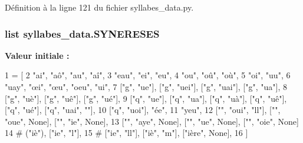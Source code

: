 Définition à la ligne 121 du fichier syllabes\+\_\+data.\+py.

\hypertarget{namespacesyllabes__data_ae813159a6c35a7e4f1f7e8714003465e}{}
\subsubsection[{S\+Y\+N\+E\+R\+E\+S\+E\+S}]{\setlength{\rightskip}{0pt plus 5cm}list syllabes\+\_\+data.\+S\+Y\+N\+E\+R\+E\+S\+E\+S}\label{namespacesyllabes__data_ae813159a6c35a7e4f1f7e8714003465e}
{\bfseries Valeur initiale \+:}
\begin{DoxyCode}
1 = [
2 \textcolor{stringliteral}{"ai"}, \textcolor{stringliteral}{"aô"}, \textcolor{stringliteral}{"au"}, \textcolor{stringliteral}{"aî"},
3 \textcolor{stringliteral}{"eau"}, \textcolor{stringliteral}{"ei"}, \textcolor{stringliteral}{"eu"},
4 \textcolor{stringliteral}{"ou"}, \textcolor{stringliteral}{"oû"}, \textcolor{stringliteral}{"où"},
5 \textcolor{stringliteral}{"oi"}, \textcolor{stringliteral}{"uu"},
6 \textcolor{stringliteral}{"uay"}, \textcolor{stringliteral}{"œi"}, \textcolor{stringliteral}{"œu"}, \textcolor{stringliteral}{"oeu"}, \textcolor{stringliteral}{"ui"},
7 [\textcolor{stringliteral}{"g"}, \textcolor{stringliteral}{"ue"}], [\textcolor{stringliteral}{"g"}, \textcolor{stringliteral}{"uei"}], [\textcolor{stringliteral}{"g"}, \textcolor{stringliteral}{"uai"}], [\textcolor{stringliteral}{"g"}, \textcolor{stringliteral}{"ua"}],
8 [\textcolor{stringliteral}{"g"}, \textcolor{stringliteral}{"uè"}], [\textcolor{stringliteral}{"g"}, \textcolor{stringliteral}{"uê"}], [\textcolor{stringliteral}{"g"}, \textcolor{stringliteral}{"ué"}],
9 [\textcolor{stringliteral}{"q"}, \textcolor{stringliteral}{"ue"}], [\textcolor{stringliteral}{"q"}, \textcolor{stringliteral}{"ua"}], [\textcolor{stringliteral}{"q"}, \textcolor{stringliteral}{"uà"}], [\textcolor{stringliteral}{"q"}, \textcolor{stringliteral}{"uê"}], [\textcolor{stringliteral}{"q"}, \textcolor{stringliteral}{"ué"}], [\textcolor{stringliteral}{"q"}, \textcolor{stringliteral}{"uai"}, \textcolor{stringliteral}{""}],
10 [\textcolor{stringliteral}{"q"}, \textcolor{stringliteral}{"uoi"}], \textcolor{stringliteral}{"ée"},
11 \textcolor{stringliteral}{"yeu"},
12 [\textcolor{stringliteral}{""}, \textcolor{stringliteral}{"oui"}, \textcolor{stringliteral}{"ll"}], [\textcolor{stringliteral}{""}, \textcolor{stringliteral}{"oue"}, \textcolor{keywordtype}{None}], [\textcolor{stringliteral}{""}, \textcolor{stringliteral}{"ie"}, \textcolor{keywordtype}{None}],
13 [\textcolor{stringliteral}{""}, \textcolor{stringliteral}{"aye"}, \textcolor{keywordtype}{None}], [\textcolor{stringliteral}{""}, \textcolor{stringliteral}{"ue"}, \textcolor{keywordtype}{None}], [\textcolor{stringliteral}{""}, \textcolor{stringliteral}{"oie"}, \textcolor{keywordtype}{None}]
14 \textcolor{comment}{# ("iè"), ["ie", "l"],}
15 \textcolor{comment}{# ["ie", "ll"], ["iè", "m"], ["ière", None],}
16 ]
\end{DoxyCode}


